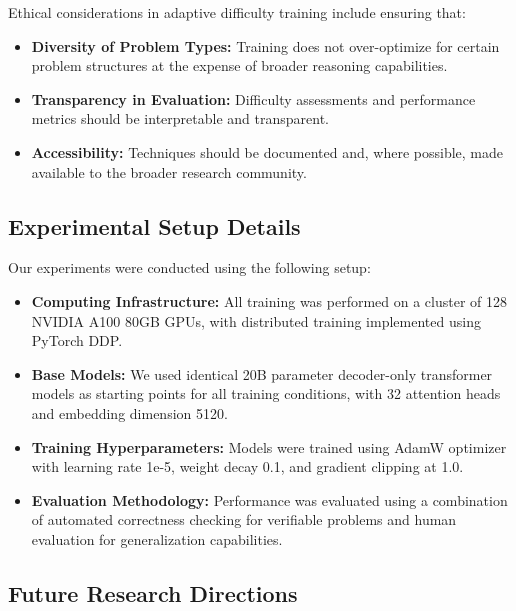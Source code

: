 Ethical considerations in adaptive difficulty training include ensuring that:

\begin{itemize}
    \item \textbf{Diversity of Problem Types:} Training does not over-optimize for certain problem structures at the expense of broader reasoning capabilities.
    
    \item \textbf{Transparency in Evaluation:} Difficulty assessments and performance metrics should be interpretable and transparent.
    
    \item \textbf{Accessibility:} Techniques should be documented and, where possible, made available to the broader research community.
\end{itemize}

\subsection{Experimental Setup Details}

Our experiments were conducted using the following setup:
\begin{itemize}
    \item \textbf{Computing Infrastructure:} All training was performed on a cluster of 128 NVIDIA A100 80GB GPUs, with distributed training implemented using PyTorch DDP.
    
    \item \textbf{Base Models:} We used identical 20B parameter decoder-only transformer models as starting points for all training conditions, with 32 attention heads and embedding dimension 5120.
    
    \item \textbf{Training Hyperparameters:} Models were trained using AdamW optimizer with learning rate 1e-5, weight decay 0.1, and gradient clipping at 1.0.
    
    \item \textbf{Evaluation Methodology:} Performance was evaluated using a combination of automated correctness checking for verifiable problems and human evaluation for generalization capabilities.
\end{itemize}

\subsection{Future Research Directions}

